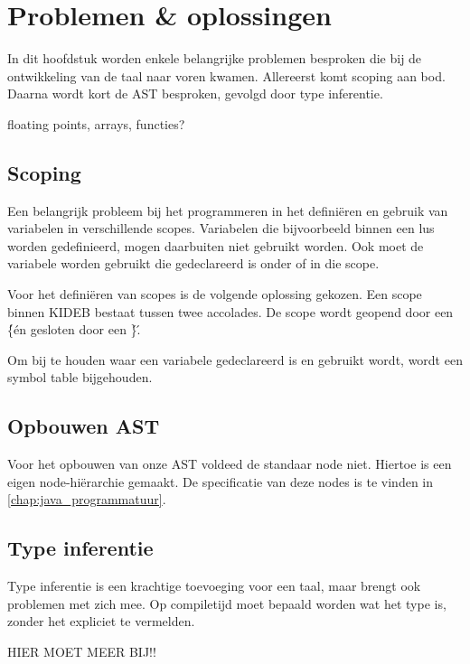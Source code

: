 \chapter{Problemen \& oplossingen}
    \label{chap:problemen_oplossingen}
In dit hoofdstuk worden enkele belangrijke problemen besproken die bij de ontwikkeling van de taal naar voren kwamen. Allereerst komt scoping aan bod. Daarna wordt kort de AST besproken, gevolgd door type inferentie. 

floating points, arrays, functies?
\section{Scoping}
    \label{sec:scoping}
Een belangrijk probleem bij het programmeren in het defini\"eren en gebruik van variabelen in verschillende scopes. Variabelen die bijvoorbeeld binnen een lus worden gedefinieerd, mogen daarbuiten niet gebruikt worden. Ook moet de variabele worden gebruikt die gedeclareerd is onder of in die scope.

Voor het defini\"eren van scopes is de volgende oplossing gekozen. Een scope binnen KIDEB bestaat tussen twee accolades. De scope wordt geopend door een \'\{\' en gesloten door een \'\}\'.

Om bij te houden waar een variabele gedeclareerd is en gebruikt wordt, wordt een symbol table bijgehouden. 

\section{Opbouwen AST}
    \label{sec:opbouw_AST}
Voor het opbouwen van onze AST voldeed de standaar node niet. Hiertoe is een eigen node-hi\"erarchie gemaakt. De specificatie van deze nodes is te vinden in \ref{chap:java_programmatuur}.

\section{Type inferentie}
    \label{sec:type_inferentie}
Type inferentie is een krachtige toevoeging voor een taal, maar brengt ook problemen met zich mee. Op compiletijd moet bepaald worden wat het type is, zonder het expliciet te vermelden.

HIER MOET MEER BIJ!!
\clearpage
